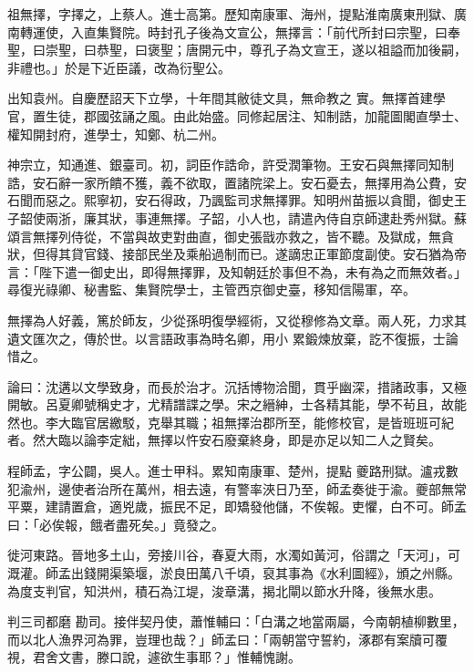\begin{pinyinscope}
 祖無擇，字擇之，上蔡人。進士高第。歷知南康軍、海州，提點淮南廣東刑獄、廣南轉運使，入直集賢院。時封孔子後為文宣公，無擇言：「前代所封曰宗聖，曰奉聖，曰崇聖，曰恭聖，曰褒聖；唐開元中，尊孔子為文宣王，遂以祖謚而加後嗣，非禮也。」於是下近臣議，改為衍聖公。



 出知袁州。自慶歷詔天下立學，十年間其敝徒文具，無命教之
 實。無擇首建學官，置生徒，郡國弦誦之風。由此始盛。同修起居注、知制誥，加龍圖閣直學士、權知開封府，進學士，知鄭、杭二州。



 神宗立，知通進、銀臺司。初，詞臣作誥命，許受潤筆物。王安石與無擇同知制誥，安石辭一家所饋不獲，義不欲取，置諸院梁上。安石憂去，無擇用為公費，安石聞而惡之。熙寧初，安石得政，乃諷監司求無擇罪。知明州苗振以貪聞，御史王子韶使兩浙，廉其狀，事連無擇。子韶，小人也，請遣內侍自京師逮赴秀州獄。蘇
 頌言無擇列侍從，不當與故吏對曲直，御史張戩亦救之，皆不聽。及獄成，無貪狀，但得其貸官錢、接部民坐及乘船過制而已。遂謫忠正軍節度副使。安石猶為帝言：「陛下遣一御史出，即得無擇罪，及知朝廷於事但不為，未有為之而無效者。」尋復光祿卿、秘書監、集賢院學士，主管西京御史臺，移知信陽軍，卒。



 無擇為人好義，篤於師友，少從孫明復學經術，又從穆修為文章。兩人死，力求其遺文匯次之，傳於世。以言語政事為時名卿，用小
 累鍛煉放棄，訖不復振，士論惜之。



 論曰：沈遘以文學致身，而長於治才。沉括博物洽聞，貫乎幽深，措諸政事，又極開敏。呂夏卿號稱史才，尤精譜諜之學。宋之縉紳，士各精其能，學不茍且，故能然也。李大臨官居繳駁，克舉其職；祖無擇治郡所至，能修校官，是皆班班可紀者。然大臨以論李定絀，無擇以忤安石廢棄終身，即是亦足以知二人之賢矣。



 程師孟，字公闢，吳人。進士甲科。累知南康軍、楚州，提點
 夔路刑獄。瀘戎數犯渝州，邊使者治所在萬州，相去遠，有警率浹日乃至，師孟奏徙于渝。夔部無常平粟，建請置倉，適兇歲，振民不足，即矯發他儲，不俟報。吏懼，白不可。師孟曰：「必俟報，餓者盡死矣。」竟發之。



 徙河東路。晉地多土山，旁接川谷，春夏大雨，水濁如黃河，俗謂之「天河」，可溉灌。師孟出錢開渠築堰，淤良田萬八千頃，裒其事為《水利圖經》，頒之州縣。為度支判官，知洪州，積石為江堤，浚章溝，揭北閘以節水升降，後無水患。



 判三司都磨
 勘司。接伴契丹使，蕭惟輔曰：「白溝之地當兩屬，今南朝植柳數里，而以北人漁界河為罪，豈理也哉？」師孟曰：「兩朝當守誓約，涿郡有案牘可覆視，君舍文書，滕口說，遽欲生事耶？」惟輔愧謝。




\end{pinyinscope}
